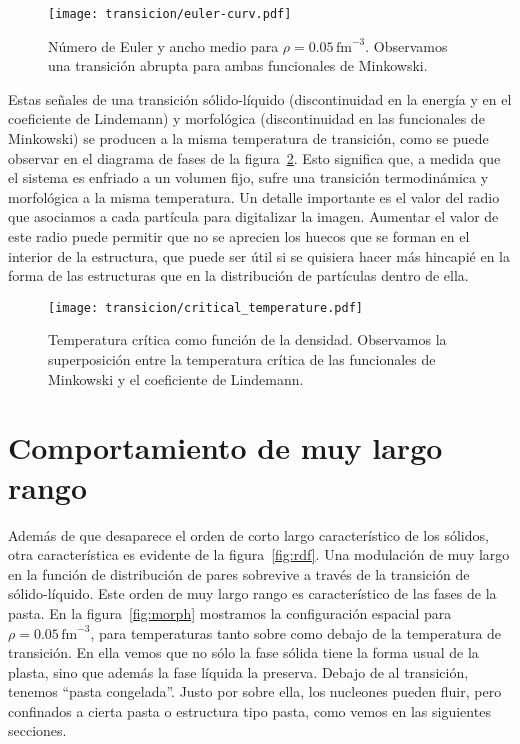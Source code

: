 \begin{figure}%
  \centering \texttt{[image: transicion/euler-curv.pdf]}
  \caption{Número de Euler y ancho medio para $\rho=0.05\,\text{fm}^{-3}$.
    Observamos una transición abrupta para ambas funcionales de Minkowski.}
  \label{fig:euler-curv}
\end{figure}

Estas señales de una transición sólido-líquido (discontinuidad en la energía y en el coeficiente de Lindemann) y morfológica (discontinuidad en las funcionales de Minkowski) se producen a la misma temperatura de transición, como se puede observar en el diagrama de fases de la figura~\ref{fig:critical_temperature}.
Esto significa que, a medida que el sistema es enfriado a un volumen fijo, sufre una transición termodinámica y morfológica a la misma temperatura.
Un detalle importante es el valor del radio que asociamos a cada partícula para digitalizar la imagen.
Aumentar el valor de este radio puede permitir que no se aprecien los huecos que se forman en el interior de la estructura, que puede ser útil si se quisiera hacer más hincapié en la forma de las estructuras que en la distribución de partículas dentro de ella.

\begin{figure}
  \centering
  \texttt{[image: transicion/critical\_temperature.pdf]}
  \caption{Temperatura crítica como función de la densidad.
    Observamos la superposición entre la temperatura crítica de las funcionales de Minkowski y el coeficiente de Lindemann.}
  \label{fig:critical_temperature}
\end{figure}


\section{Comportamiento de muy largo rango}\label{very_long}
Además de que desaparece el orden de corto largo característico de los sólidos, otra característica es evidente de la figura~\ref{fig:rdf}.
Una modulación de muy largo en la función de distribución de pares sobrevive a través de la transición de sólido-líquido.
Este orden de muy largo rango es característico de las fases de la pasta.
En la figura~\ref{fig:morph} mostramos la configuración espacial para $\rho=0.05\,\text{fm}^{-3}$, para temperaturas tanto sobre como debajo de la temperatura de transición.
En ella vemos que no sólo la fase sólida tiene la forma usual de la plasta, sino que además la fase líquida la preserva.
Debajo de al transición, tenemos ``pasta congelada''.
Justo por sobre ella, los nucleones pueden fluir, pero confinados a cierta pasta o estructura tipo pasta, como vemos en las siguientes secciones.

